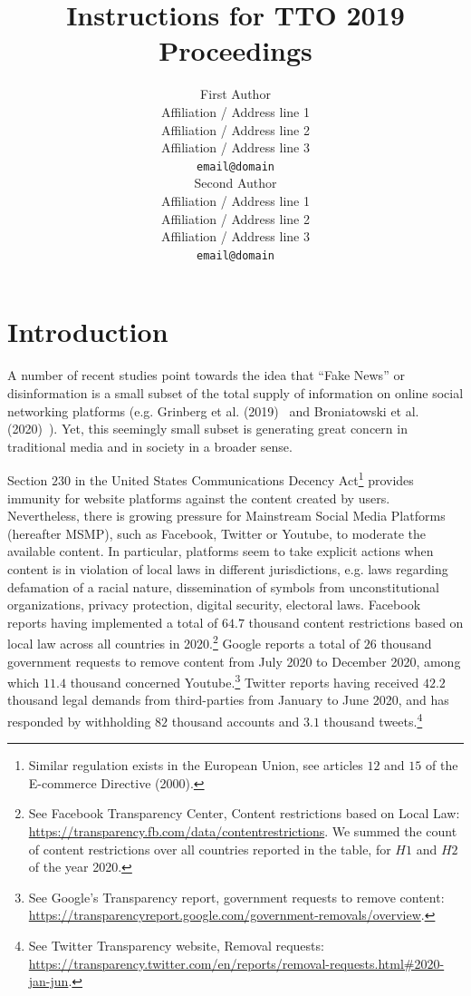 \documentclass[11pt,a4paper]{article}
\title{Instructions for TTO 2019 Proceedings}
\author{First Author \\
  Affiliation / Address line 1 \\
  Affiliation / Address line 2 \\
  Affiliation / Address line 3 \\
  \texttt{email@domain} \\\And
  Second Author \\
  Affiliation / Address line 1 \\
  Affiliation / Address line 2 \\
  Affiliation / Address line 3 \\
  \texttt{email@domain} \\}
\date{}
\begin{document}
\maketitle
\begin{abstract}

\end{abstract}

\section{Introduction}


A number of recent studies  point towards the idea that ``Fake News'' or disinformation is a small subset of the total supply of information on online social networking platforms (e.g. Grinberg et al. (2019)~\cite{grinberg} and Broniatowski et al. (2020)~\cite{broniatowski}). Yet, this seemingly small subset is generating great concern in traditional media and in society in a broader sense. 

Section $230$ in the United States Communications Decency Act\footnote{Similar regulation exists in the European Union, see articles $12$ and $15$ of the E-commerce Directive (2000). } provides immunity for website platforms against the content created by users. Nevertheless, there is growing pressure for Mainstream Social Media Platforms (hereafter MSMP), such as Facebook, Twitter or Youtube, to moderate the available content. In particular, platforms seem to take explicit actions when content is in violation of local laws in different jurisdictions, e.g. laws regarding defamation of a racial nature, dissemination of symbols from unconstitutional organizations, privacy protection, digital security, electoral laws. Facebook reports having implemented a total of $64.7$ thousand content restrictions based on local law across all countries in 2020.\footnote{See Facebook Transparency Center, Content restrictions based on Local Law: \href{https://transparency.fb.com/data/content\-restrictions}{https://transparency.fb.com/data/content\-restrictions}. We summed the count of content restrictions over all countries reported in the table, for $H1$ and $H2$ of the year 2020.} Google reports a total of $26$ thousand government requests to remove content from July 2020 to December 2020, among which $11.4$ thousand concerned Youtube.\footnote{See Google's Transparency report, government requests to remove content: \href{https://transparencyreport.google.com/government-removals/overview}{https://transparencyreport.google.com/government-removals/overview}.} Twitter reports having received $42.2$ thousand legal demands from third-parties from January to June 2020, and has responded by withholding $82$ thousand accounts and $3.1$ thousand tweets.\footnote{See Twitter Transparency website, Removal requests: \href{https://transparency.twitter.com/en/reports/removal-requests.html\#2020-jan-jun}{https://transparency.twitter.com/en/reports/removal-requests.html\#2020-jan-jun}.} 
\end{document}
